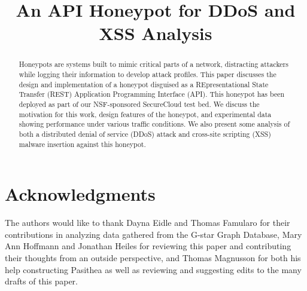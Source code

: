 \documentclass[10pt, conference]{IEEEtran}
\begin{document}
%
\title{An API Honeypot for DDoS and XSS Analysis}


\author{
}


\maketitle


\begin{abstract}
Honeypots are systems built to mimic critical parts of a network, distracting attackers while logging their information to develop attack profiles. 
This paper discusses the design and implementation of a honeypot disguised as a REpresentational State Transfer (REST) Application Programming Interface (API). 
This honeypot has been deployed as part of our NSF-sponsored SecureCloud test bed.  
We discuss the motivation for this work, design features of the honeypot, and experimental data showing performance under various traffic conditions.  
We also present some analysis of both a distributed denial of service (DDoS) attack and cross-site scripting (XSS) malware insertion against this honeypot.
\end{abstract}







\section*{Acknowledgments} \label{Acknowledgements}
The authors would like to thank Dayna Eidle and Thomas Famularo for their contributions in analyzing data gathered from the G-star Graph Database, Mary Ann Hoffmann and Jonathan Heiles for reviewing this paper and contributing their thoughts from an outside perspective, and Thomas Magnusson for both his help constructing Pasithea as well as reviewing and suggesting edits to the many drafts of this paper.
\end{document}
